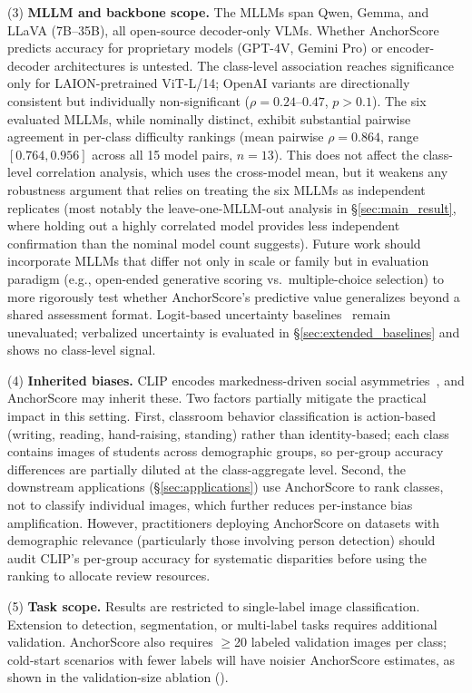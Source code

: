 \documentclass[11pt,a4paper]{article}
\begin{document}
(3) \textbf{MLLM and backbone scope.} The MLLMs span Qwen, Gemma, and LLaVA (7B--35B), all open-source decoder-only VLMs. Whether AnchorScore predicts accuracy for proprietary models (GPT-4V, Gemini Pro) or encoder-decoder architectures is untested. The class-level association reaches significance only for LAION-pretrained ViT-L/14; OpenAI variants are directionally consistent but individually non-significant ($\rho=0.24$--$0.47$, $p>0.1$). The six evaluated MLLMs, while nominally distinct, exhibit substantial pairwise agreement in per-class difficulty rankings (mean pairwise $\rho=0.864$, range $[0.764, 0.956]$ across all 15 model pairs, $n=13$). This does not affect the class-level correlation analysis, which uses the cross-model mean, but it weakens any robustness argument that relies on treating the six MLLMs as independent replicates (most notably the leave-one-MLLM-out analysis in \S\ref{sec:main_result}, where holding out a highly correlated model provides less independent confirmation than the nominal model count suggests). Future work should incorporate MLLMs that differ not only in scale or family but in evaluation paradigm (e.g., open-ended generative scoring vs.\ multiple-choice selection) to more rigorously test whether AnchorScore's predictive value generalizes beyond a shared assessment format. Logit-based uncertainty baselines~\cite{kadavath2022language} remain unevaluated; verbalized uncertainty is evaluated in \S\ref{sec:extended_baselines} and shows no class-level signal.

(4) \textbf{Inherited biases.} CLIP encodes markedness-driven social asymmetries~\cite{wolfe2022clip}, and AnchorScore may inherit these. Two factors partially mitigate the practical impact in this setting. First, classroom behavior classification is action-based (writing, reading, hand-raising, standing) rather than identity-based; each class contains images of students across demographic groups, so per-group accuracy differences are partially diluted at the class-aggregate level. Second, the downstream applications (\S\ref{sec:applications}) use AnchorScore to rank classes, not to classify individual images, which further reduces per-instance bias amplification. However, practitioners deploying AnchorScore on datasets with demographic relevance (particularly those involving person detection) should audit CLIP's per-group accuracy for systematic disparities before using the ranking to allocate review resources.

(5) \textbf{Task scope.} Results are restricted to single-label image classification. Extension to detection, segmentation, or multi-label tasks requires additional validation. AnchorScore also requires $\geq$20 labeled validation images per class; cold-start scenarios with fewer labels will have noisier AnchorScore estimates, as shown in the validation-size ablation ().
\end{document}
